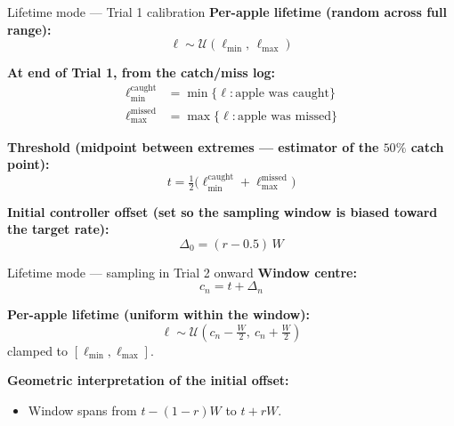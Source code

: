 \documentclass[10pt,aspectratio=169]{beamer}
\newcommand{\target}{r}
\begin{document}
\begin{frame}{Lifetime mode --- Trial 1 calibration}
\textbf{Per-apple lifetime (random across full range):}
\[
\ell \sim \mathcal{U}(\ell_{\min},\, \ell_{\max})
\]

\textbf{At end of Trial 1, from the catch/miss log:}
\begin{align*}
\ell_{\min}^{\text{caught}} &= \min \{\ell : \text{apple was caught}\} \\
\ell_{\max}^{\text{missed}} &= \max \{\ell : \text{apple was missed}\}
\end{align*}

\textbf{Threshold (midpoint between extremes --- estimator of the $50\%$ catch point):}
\[
\boxed{t = \tfrac{1}{2}\bigl(\ell_{\min}^{\text{caught}} + \ell_{\max}^{\text{missed}}\bigr)}
\]

\textbf{Initial controller offset (set so the sampling window is biased toward the target rate):}
\[
\Delta_0 = (\target - 0.5)\, W
\]
\end{frame}

\begin{frame}{Lifetime mode --- sampling in Trial 2 onward}
\textbf{Window centre:}
\[
c_n = t + \Delta_n
\]

\textbf{Per-apple lifetime (uniform within the window):}
\[
\ell \sim \mathcal{U}\!\left( c_n - \tfrac{W}{2},\ c_n + \tfrac{W}{2} \right)
\]
clamped to $[\ell_{\min}, \ell_{\max}]$.

\vspace{1em}
\textbf{Geometric interpretation of the initial offset:}
\begin{itemize}
    \item Window spans from $t - (1-\target)W$ to $t + \target W$.
\end{itemize}
\end{frame}
\end{document}
